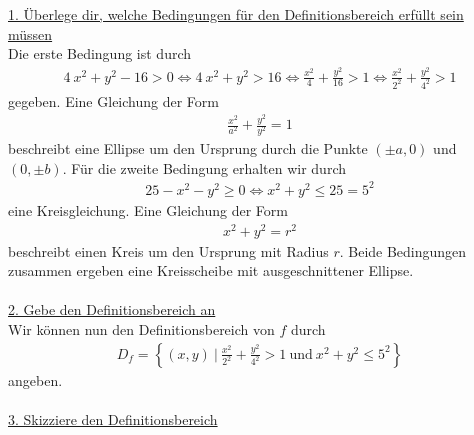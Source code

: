 \underline{1. Überlege dir, welche Bedingungen für den Definitionsbereich erfüllt sein müssen}\\
Die erste Bedingung ist durch
\begin{align*}
4 \ x^2 + y^2 -16 > 0
\Leftrightarrow
4 \ x^2 + y^2 > 16
\Leftrightarrow
\frac{x^2}{4} + \frac{y^2}{16} > 1
\Leftrightarrow
\frac{x^2}{2^2} + \frac{y^2}{4^2} > 1 
\end{align*}
gegeben.
Eine Gleichung der Form 
\begin{align*}
\frac{x^2}{a^2} + \frac{y^2}{y^2} = 1
\end{align*}
beschreibt eine Ellipse um den Ursprung durch die Punkte $(\pm a , 0)$ und $(0, \pm b)$.
Für die zweite Bedingung erhalten wir durch
\begin{align*}
25 -x^2 -y^2 \geq 0
\Leftrightarrow
x^2 + y^2 \leq  25 = 5^2
\end{align*}
eine Kreisgleichung.
Eine Gleichung der Form 
\begin{align*}
x^2 + y^2 =r^2
\end{align*}
beschreibt einen Kreis um den Ursprung mit Radius $r$.
Beide Bedingungen zusammen ergeben eine Kreisscheibe mit ausgeschnittener Ellipse.\\
\\
\underline{2. Gebe den Definitionsbereich an}\\
Wir können nun den Definitionsbereich von $f$ durch
\begin{align*}
D_f
=
\left\lbrace (x,y) \ | \ 
\frac{x^2}{2^2} + \frac{y^2}{4^2} > 1
\ \text{und} \
x^2 + y^2 \leq 5^2 \right\rbrace
\end{align*}
angeben.
\\
\\
\newpage
\underline{3. Skizziere den Definitionsbereich}\\

\pgfplotsset{compat=1.3,compat/path replacement=1.5.1}
\begin{figure}[h]
\centering
{}
\end{figure}


